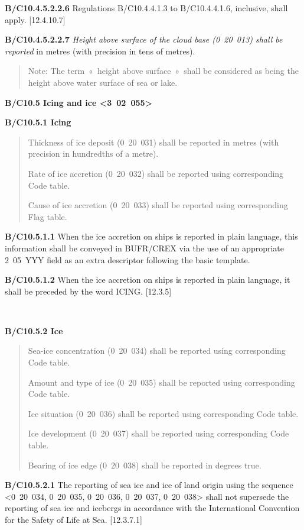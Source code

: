 \textbf{B/C10.4.5.2.2.6} Regulations B/C10.4.4.1.3 to B/C10.4.4.1.6, inclusive, shall apply. {[}12.4.10.7{]}

\textbf{B/C10.4.5.2.2.7} \emph{Height above surface of the cloud base (0~20~013) shall be reported} in metres (with precision in tens of metres).

\begin{quote}
Note: The term~«~height above surface~»~shall be considered as being the height above water surface of sea or lake.
\end{quote}

\textbf{B/C10.5 Icing and ice \textless3~02~055\textgreater{}}

\textbf{B/C10.5.1 Icing}

\begin{quote}
Thickness of ice deposit (0~20~031) shall be reported in metres (with precision in hundredths of a metre).

Rate of ice accretion (0~20~032) shall be reported using corresponding Code table.

Cause of ice accretion (0~20~033) shall be reported using corresponding Flag table.
\end{quote}

\textbf{B/C10.5.1.1} When the ice accretion on ships is reported in plain language, this information shall be conveyed in BUFR/CREX via the use of an appropriate 2~05~YYY field as an extra descriptor following the basic template.

\textbf{B/C10.5.1.2} When the ice accretion on ships is reported in plain language, it shall be preceded by the word ICING. {[}12.3.5{]}

\textbf{\\
}

\textbf{B/C10.5.2 Ice}

\begin{quote}
Sea-ice concentration (0~20~034) shall be reported using corresponding Code table.

Amount and type of ice (0~20~035) shall be reported using corresponding Code table.

Ice situation (0~20~036) shall be reported using corresponding Code table.

Ice development (0~20~037) shall be reported using corresponding Code table.

Bearing of ice edge (0~20~038) shall be reported in degrees true.
\end{quote}

\textbf{B/C10.5.2.1} The reporting of sea ice and ice of land origin using the sequence \textless0~20~034, 0~20~035, 0~20~036, 0~20~037, 0~20~038\textgreater{} shall not supersede the reporting of sea ice and icebergs in accordance with the International Convention for the Safety of Life at Sea. {[}12.3.7.1{]}

